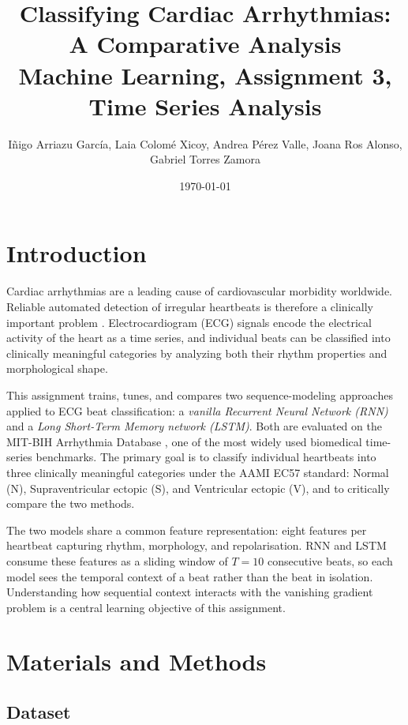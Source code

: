 \documentclass[twocolumn, fontsize=10pt]{article}
\title{
\Large
\centering
\textbf{Classifying Cardiac Arrhythmias: A Comparative Analysis} \\
[8pt]
\Large \textcolor{RCharcoal}{Machine Learning, Assignment 3, Time Series Analysis} \\[10pt]}
\date{\today}
\author{{\normalsize Iñigo Arriazu García, Laia Colomé Xicoy, Andrea Pérez Valle, Joana Ros Alonso, Gabriel Torres Zamora}}
\makeatletter
\renewcommand{\maketitle}{\bgroup\setlength{\parindent}{0pt}
\begin{flushleft}
  \@title
  \@author \\
  \@date
\end{flushleft}\egroup
}
\makeatother
\begin{document}
\twocolumn[ \maketitle ]


\section{Introduction}
\label{sec:intro}

Cardiac arrhythmias are a leading cause of cardiovascular morbidity worldwide. Reliable automated detection of irregular heartbeats is therefore a clinically important problem \citep{moody2001impact}. Electrocardiogram (ECG) signals encode the electrical activity of the heart as a time series, and individual beats can be classified into clinically meaningful categories by analyzing both their rhythm properties and morphological shape.

This assignment trains, tunes, and compares two sequence-modeling approaches applied to ECG beat classification: a \textit{vanilla Recurrent Neural Network (RNN)} and a \textit{Long Short-Term Memory network (LSTM)}. Both are evaluated on the MIT-BIH Arrhythmia Database \citep{moody2001impact}, one of the most widely used biomedical time-series benchmarks. The primary goal is to classify individual heartbeats into three clinically meaningful categories under the AAMI EC57 standard: Normal (N), Supraventricular ectopic (S), and Ventricular ectopic (V), and to critically compare the two methods.

The two models share a common feature representation: eight features per heartbeat capturing rhythm, morphology, and repolarisation. RNN and LSTM consume these features as a sliding window of $T = 10$ consecutive beats, so each model sees the temporal context of a beat rather than the beat in isolation. Understanding how sequential context interacts with the vanishing gradient problem is a central learning objective of this assignment.


\section{Materials and Methods}
\label{sec:methods}

\subsection{Dataset}
\end{document}
